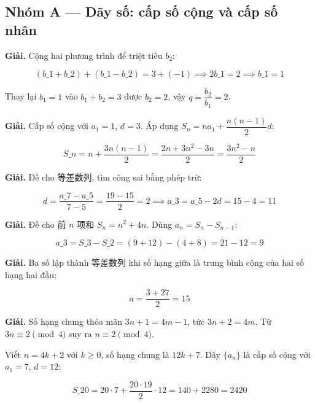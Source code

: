 \documentclass[11pt, a4paper]{article}
\begin{document}

\subsection*{Nhóm A — Dãy số: cấp số cộng và cấp số nhân}

\begin{dapan}[1 — Đáp án A]
\textbf{Giải.} Cộng hai phương trình để triệt tiêu $b_2$:

$$(b\_1 + b\_2) + (b\_1 - b\_2) = 3 + (-1) \implies 2b\_1 = 2 \implies b\_1 = 1$$

Thay lại $b_1 = 1$ vào $b_1 + b_2 = 3$ được $b_2 = 2$, vậy $q = \dfrac{b_2}{b_1} = 2$.
\end{dapan}

\begin{dapan}[2 — Đáp án C]
\textbf{Giải.} Cấp số cộng với $a_1 = 1$, $d = 3$. Áp dụng $S_n = na_1 + \dfrac{n(n-1)}{2}d$:

$$S\_n = n + \frac{3n(n-1)}{2} = \frac{2n + 3n^2 - 3n}{2} = \frac{3n^2 - n}{2}$$
\end{dapan}

\begin{dapan}[3 — Đáp án C]
\textbf{Giải.} Đề cho 等差数列, tìm công sai bằng phép trừ:

$$d = \frac{a\_7 - a\_5}{7 - 5} = \frac{19 - 15}{2} = 2 \implies a\_3 = a\_5 - 2d = 15 - 4 = 11$$
\end{dapan}

\begin{dapan}[4 — Đáp án D]
\textbf{Giải.} Đề cho 前 $n$ 项和 $S_n = n^2 + 4n$. Dùng $a_n = S_n - S_{n-1}$:

$$a\_3 = S\_3 - S\_2 = (9 + 12) - (4 + 8) = 21 - 12 = 9$$
\end{dapan}

\begin{dapan}[5 — Đáp án B]
\textbf{Giải.} Ba số lập thành 等差数列 khi số hạng giữa là trung bình cộng của hai số hạng hai đầu:

$$a = \frac{3 + 27}{2} = 15$$
\end{dapan}

\begin{dapan}[6 — Đáp án C]
\textbf{Giải.} Số hạng chung thỏa mãn $3n + 1 = 4m - 1$, tức $3n + 2 = 4m$. Từ $3n \equiv 2 \pmod 4$ suy ra $n \equiv 2 \pmod 4$.

Viết $n = 4k + 2$ với $k \ge 0$, số hạng chung là $12k + 7$. Dãy $\{a_n\}$ là cấp số cộng với $a_1 = 7$, $d = 12$:

$$S\_{20} = 20 \cdot 7 + \frac{20 \cdot 19}{2} \cdot 12 = 140 + 2280 = 2420$$
\end{dapan}
\end{document}
